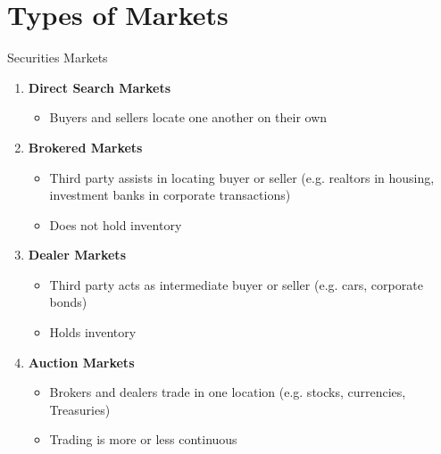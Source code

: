 \documentclass{beamer}
\begin{document}
\section{Types of Markets}
\begin{frame}{Securities Markets}
	\begin{enumerate}
		\item \textbf{Direct Search Markets}
		\begin{itemize}
			\item Buyers and sellers locate one another on their own 
		\end{itemize}
			\item \textbf{Brokered Markets}
		\begin{itemize}
			\item Third party assists in locating buyer or seller (e.g. realtors in housing, investment banks in corporate transactions)
			\item Does not hold inventory
		\end{itemize}
		\item \textbf{Dealer Markets}
		\begin{itemize}
			\item Third party acts as intermediate buyer or seller (e.g. cars, corporate bonds)
			\item Holds inventory
		\end{itemize}
		\item \textbf{Auction Markets}
		\begin{itemize}
			\item Brokers and dealers trade in one location (e.g. stocks, currencies, Treasuries)
			\item Trading is more or less continuous
		\end{itemize}
	\end{enumerate}
\end{frame}

\end{document}
